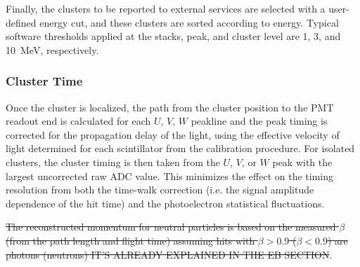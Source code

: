 Finally, the clusters to be reported to external services are selected with a user-defined energy cut, and these
clusters are sorted according to energy. Typical software thresholds applied at the {\color{red} stacks}, peak, and cluster level
are 1, 3, and 10~MeV, respectively.

\subsubsection {Cluster Time}
\label{ec-time}

Once the cluster is localized, the path from the cluster position to the PMT readout end is calculated for each
$U$, $V$, $W$ peakline and the peak timing is corrected for the propagation delay of the light, using the effective
velocity of light determined for each scintillator from the calibration procedure. For isolated clusters, the cluster
timing is then taken from the $U$, $V$, or $W$ peak with the largest uncorrected raw ADC value. This minimizes
the effect on the timing resolution from both the time-walk correction (i.e. the signal amplitude dependence of the
hit time) and the photoelectron statistical fluctuations.

{\color{red}\sout{The reconstructed momentum for neutral particles is based on the measured $\beta$ (from the path length and
flight time) assuming hits with $\beta > 0.9$ ($\beta < 0.9$) are photons (neutrons) IT'S ALREADY EXPLAINED IN THE EB SECTION}}.
